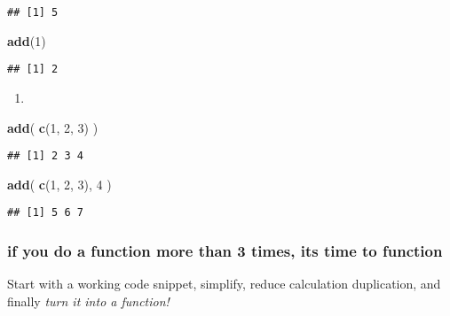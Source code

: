 \documentclass[]{article}
\newenvironment{Shaded}{\begin{snugshade}}{\end{snugshade}}
\newcommand{\DecValTok}[1]{\textcolor[rgb]{0.00,0.00,0.81}{#1}}
\newcommand{\KeywordTok}[1]{\textcolor[rgb]{0.13,0.29,0.53}{\textbf{#1}}}
\newcommand{\NormalTok}[1]{#1}
\begin{document}
\begin{verbatim}
## [1] 5
\end{verbatim}

\begin{Shaded}
\begin{Highlighting}[]
\KeywordTok{add}\NormalTok{(}\DecValTok{1}\NormalTok{)}
\end{Highlighting}
\end{Shaded}

\begin{verbatim}
## [1] 2
\end{verbatim}

\begin{enumerate}
\def\labelenumi{\arabic{enumi}.}
\setcounter{enumi}{1}
\item
\end{enumerate}

\begin{Shaded}
\begin{Highlighting}[]
\KeywordTok{add}\NormalTok{( }\KeywordTok{c}\NormalTok{(}\DecValTok{1}\NormalTok{, }\DecValTok{2}\NormalTok{, }\DecValTok{3}\NormalTok{) )}
\end{Highlighting}
\end{Shaded}

\begin{verbatim}
## [1] 2 3 4
\end{verbatim}

\begin{Shaded}
\begin{Highlighting}[]
\KeywordTok{add}\NormalTok{( }\KeywordTok{c}\NormalTok{(}\DecValTok{1}\NormalTok{, }\DecValTok{2}\NormalTok{, }\DecValTok{3}\NormalTok{), }\DecValTok{4}\NormalTok{ )}
\end{Highlighting}
\end{Shaded}

\begin{verbatim}
## [1] 5 6 7
\end{verbatim}

\hypertarget{if-you-do-a-function-more-than-3-times-its-time-to-function}{%
\subsubsection{\texorpdfstring{if you do a function more than 3 times,
its time to
\textbf{function}}{if you do a function more than 3 times, its time to function}}\label{if-you-do-a-function-more-than-3-times-its-time-to-function}}

Start with a working code snippet, simplify, reduce calculation
duplication, and finally \emph{turn it into a function!}
\end{document}
